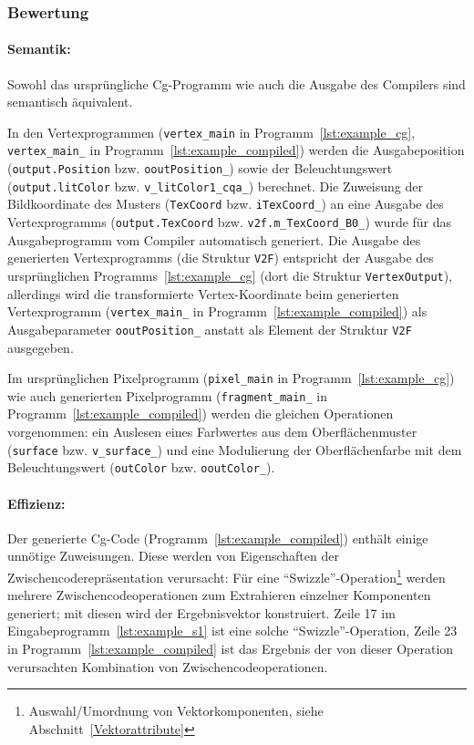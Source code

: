 \documentclass[twoside,a4paper,fleqn,12pt]{book}
\begin{document}
\subsubsection*{Bewertung}
\paragraph{Semantik:} Sowohl das ursprüngliche Cg-Programm wie auch die Ausgabe des Compilers sind semantisch
äquivalent.

In den Vertexprogrammen (\verb+vertex_main+ in Programm~\ref{lst:example_cg}, \verb+vertex_main_+ in Programm~\ref{lst:example_compiled}) werden die Ausgabeposition (\verb+output.Position+ bzw. \verb+ooutPosition_+) sowie 
der Beleuchtungswert (\verb+output.litColor+ bzw. \verb+v_litColor1_cqa_+) berechnet. Die Zuweisung der Bildkoordinate des Musters
(\verb+TexCoord+ bzw. \verb+iTexCoord_+) an eine Ausgabe des Vertexprogramms (\verb+output.TexCoord+ bzw. \verb+v2f.m_TexCoord_B0_+)
wurde für das Ausgabeprogramm vom Compiler automatisch generiert. Die Ausgabe des generierten Vertexprogramms (die Struktur \verb+V2F+)
entspricht der Ausgabe des ursprünglichen Programms~\ref{lst:example_cg} (dort die Struktur \verb+VertexOutput+), allerdings wird die transformierte
Vertex-Koordinate beim generierten Vertexprogramm (\verb+vertex_main_+ in Programm~\ref{lst:example_compiled}) als Ausgabeparameter \verb+ooutPosition_+ anstatt als
Element der Struktur \verb+V2F+ ausgegeben.

Im ursprünglichen Pixelprogramm (\verb+pixel_main+ in Programm~\ref{lst:example_cg}) 
wie auch generierten Pixelprogramm (\verb+fragment_main_+ in Programm~\ref{lst:example_compiled}) werden die gleichen Operationen vorgenommen:
ein Auslesen eines Farbwertes aus dem Oberflächenmuster (\verb+surface+ bzw. \verb+v_surface_+)
und eine Modulierung der Oberflächenfarbe mit dem Beleuchtungswert (\verb+outColor+ bzw. \verb+ooutColor_+).

\paragraph{Effizienz:} Der generierte Cg-Code (Programm~\ref{lst:example_compiled}) enthält einige unnötige Zuweisungen.
Diese werden von Eigenschaften der Zwischencoderepräsentation verursacht:
Für eine ``Swizzle''-Operation\footnote{Auswahl/Umordnung von Vektorkomponenten, siehe Abschnitt~\ref{Vektorattribute}}
werden mehrere Zwischencodeoperationen zum Extrahieren einzelner Komponenten generiert; mit diesen wird der Ergebnisvektor
konstruiert. Zeile 17 im Eingabeprogramm~\ref{lst:example_s1} ist eine solche ``Swizzle''-Operation,
Zeile 23 in Programm~\ref{lst:example_compiled} ist das Ergebnis der von dieser Operation verursachten Kombination von Zwischencodeoperationen.
\end{document}
